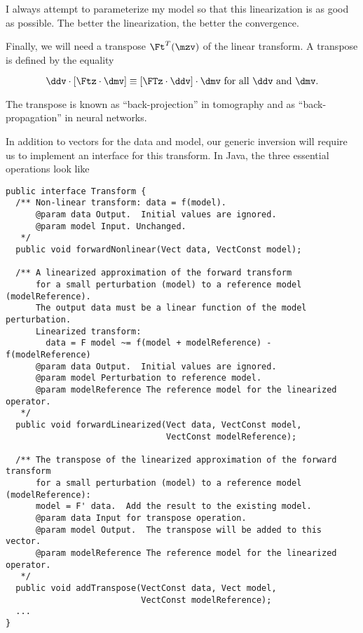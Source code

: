 \documentclass[12pt]{article}
\begin{document}
\noindent I always attempt to parameterize my
model so that this linearization is as good
as possible.  The better the linearization,
the better the convergence.

Finally, we will need a transpose $\Ft^T
(\mzv)$ of the linear transform.  A transpose
is defined by the equality

\begin{equation} 
\ddv \cdot [ \Ftz \cdot \dmv ] 
\equiv [\FTz \cdot \ddv ] \cdot \dmv ~ \mbox{for all} ~\ddv~
\mbox{and} ~\dmv.  
\end{equation}

\noindent The transpose is known as
``back-projection'' in tomography and as
``back-propagation'' in neural networks.

In addition to vectors for the data and
model, our generic inversion will require us
to implement an interface for this transform.
In Java, the three essential operations look
like

{\footnotesize \begin{verbatim} 
public interface Transform {
  /** Non-linear transform: data = f(model).
      @param data Output.  Initial values are ignored.
      @param model Input. Unchanged.
   */
  public void forwardNonlinear(Vect data, VectConst model);

  /** A linearized approximation of the forward transform
      for a small perturbation (model) to a reference model (modelReference).
      The output data must be a linear function of the model perturbation.
      Linearized transform:
        data = F model ~= f(model + modelReference) - f(modelReference)
      @param data Output.  Initial values are ignored.
      @param model Perturbation to reference model.
      @param modelReference The reference model for the linearized operator.
   */
  public void forwardLinearized(Vect data, VectConst model,
                                VectConst modelReference);

  /** The transpose of the linearized approximation of the forward transform
      for a small perturbation (model) to a reference model (modelReference):
      model = F' data.  Add the result to the existing model.
      @param data Input for transpose operation.
      @param model Output.  The transpose will be added to this vector.
      @param modelReference The reference model for the linearized operator.
   */
  public void addTranspose(VectConst data, Vect model,
                           VectConst modelReference);
  ...
}
\end{verbatim}} 
\end{document}
